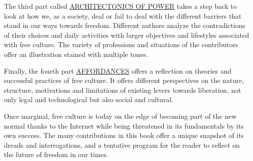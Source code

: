 The third part called
\href{architectonics-of-power/index.html}{ARCHITECTONICS OF POWER} takes
a step back to look at how we, as a society, deal or fail to deal with
the different barriers that stand in our ways towards freedom. Different
authors analyze the contradictions of their choices and daily activities
with larger objectives and lifestyles associated with free culture. The
variety of professions and situations of the contributors offer an
illustration stained with multiple tones.

Finally, the fourth part \href{affordances/index.html}{AFFORDANCES}
offers a reflection on theories and successful practices of free
culture. It offers different perspectives on the nature, structure,
motivations and limitations of existing levers towards liberation, not
only legal and technological but also social and cultural.

Once marginal, free culture is today on the edge of becoming part of the
new normal thanks to the Internet while being threatened in its
fundamentals by its own success. The many contributions in this book
offer a unique snapshot of its dreads and interrogations, and a
tentative program for the reader to reflect on the future of freedom in
our times.
